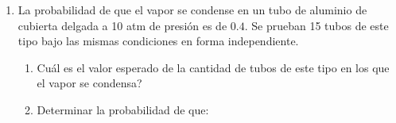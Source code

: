 \documentclass[11pt,a4paper,twoside]{article}%
\begin{document}
\begin{enumerate}
%
%
%

\item La probabilidad de que el vapor se condense en un tubo de aluminio de
cubierta delgada a 10 atm de presi\'{o}n es de $0.4$. Se prueban 15 tubos de
este tipo bajo las mismas condiciones en forma independiente.

\begin{enumerate}
\item \textquestiondown Cu\'{a}l es el valor esperado de la cantidad de tubos
de este tipo en los que el vapor se condensa?

\item Determinar la probabilidad de que:


\end{enumerate}
\end{enumerate}
\end{document}
